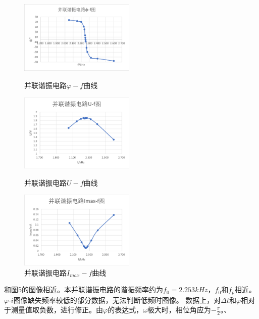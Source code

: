\documentclass[UTF8]{article}
\begin{document}
\begin{enumerate}
\begin{table}[htbp]
\begin{tabular}{|r|r|r|r|r|r|r|}
            \end{tabular}%
          \label{tab:并联电路的相频特性和幅频特性}%
        \end{table}%
        \begin{figure}[H]
            \begin{minipage}[t]{0.33\linewidth}
                \centering
                \includegraphics[width=5.5cm]{Fig/9-φf.png}
                \caption{并联谐振电路$\varphi - f$曲线}
            \end{minipage}
            \begin{minipage}[t]{0.33\linewidth}
                \centering
                \includegraphics[width=5.5cm]{Fig/9-uf.png}
                \caption{并联谐振电路$U - f$曲线}
            \end{minipage}
            \begin{minipage}[t]{0.33\linewidth}
                \centering
                \includegraphics[width=5.5cm]{Fig/9-if.png}
                \caption{并联谐振电路$I_{max} - f$曲线}
            \end{minipage}
        \end{figure}
        \hspace*{2em}和图5的图像相近。本并联谐振电路的谐振频率约为$f_0=2.253kHz$，$f_0$和$f_p$相近。$\varphi\text{-}i$图像缺失频率较低的部分数据，无法判断低频时图像。
        \newline \hspace*{2em}数据上，对$\Delta t$和$\varphi$相对于测量值取负数，进行修正。由$\varphi$的表达式，$\omega$极大时，相位角应为$-\frac{\pi}{2}$。、

\end{enumerate}
\end{document}
